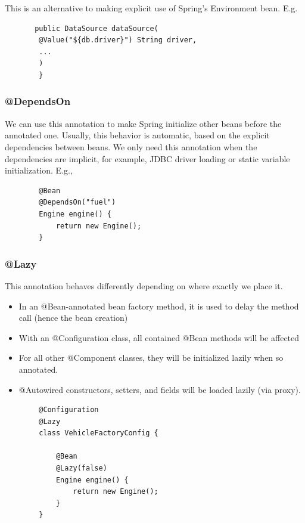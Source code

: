 \documentclass{scrartcl}
\begin{document}
    This is an alternative to making explicit use of Spring's Environment bean. E.g.

    \begin{lstlisting}
       public DataSource dataSource(
        @Value("${db.driver}") String driver,
        ...
        )
        }
    \end{lstlisting}

\subsubsection{@DependsOn}

    We can use this annotation to make Spring initialize other beans before the annotated one. Usually, this behavior is automatic, based on the explicit dependencies between beans. We only need this annotation when the dependencies are implicit, for example, JDBC driver loading or static variable initialization. E.g.,

     \begin{lstlisting}
        @Bean
        @DependsOn("fuel")
        Engine engine() {
            return new Engine();
        }
    \end{lstlisting}

\subsubsection{@Lazy}

    This annotation behaves differently depending on where exactly we place it.

    \begin{itemize}
        \item In an @Bean-annotated bean factory method, it is used to delay the method call (hence the bean creation)
        \item With an @Configuration class, all contained @Bean methods will be affected
        \item For all other @Component classes,  they will be initialized lazily when so annotated.
        \item @Autowired constructors, setters, and fields will be loaded lazily (via proxy).
    \end{itemize}

    \begin{lstlisting}
        @Configuration
        @Lazy
        class VehicleFactoryConfig {

            @Bean
            @Lazy(false)
            Engine engine() {
                return new Engine();
            }
        }
    \end{lstlisting}
\end{document}
